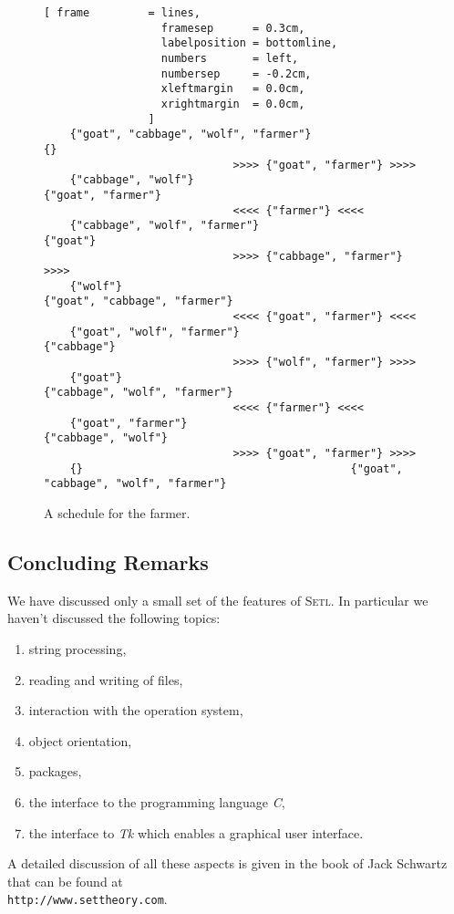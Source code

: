 \begin{figure}[!ht]
  \centering
\begin{Verbatim}[ frame         = lines, 
                  framesep      = 0.3cm, 
                  labelposition = bottomline,
                  numbers       = left,
                  numbersep     = -0.2cm,
                  xleftmargin   = 0.0cm,
                  xrightmargin  = 0.0cm,
                ]
    {"goat", "cabbage", "wolf", "farmer"}                                         {}
                             >>>> {"goat", "farmer"} >>>> 
    {"cabbage", "wolf"}                                           {"goat", "farmer"}
                             <<<< {"farmer"} <<<< 
    {"cabbage", "wolf", "farmer"}                                           {"goat"}
                             >>>> {"cabbage", "farmer"} >>>> 
    {"wolf"}                                           {"goat", "cabbage", "farmer"}
                             <<<< {"goat", "farmer"} <<<< 
    {"goat", "wolf", "farmer"}                                           {"cabbage"}
                             >>>> {"wolf", "farmer"} >>>> 
    {"goat"}                                           {"cabbage", "wolf", "farmer"}
                             <<<< {"farmer"} <<<< 
    {"goat", "farmer"}                                           {"cabbage", "wolf"}
                             >>>> {"goat", "farmer"} >>>> 
    {}                                         {"goat", "cabbage", "wolf", "farmer"}
\end{Verbatim} 
\vspace*{-0.3cm}
\caption{A schedule for the farmer.}  
\label{fig:wolf-ziege-solution}
\end{figure} %
\noindent
\pagebreak

\subsection{Concluding Remarks}
We have discussed only a small set of the features of  \textsc{Setl}.
In particular we haven't discussed the following topics:
\begin{enumerate}
\item string processing,
\item reading and writing of files,
\item interaction with the operation system,
\item object orientation,
\item packages,
\item the interface to the programming language  \textsl{C},
\item the interface to \textsl{Tk} which enables a graphical user interface.
\end{enumerate}
A detailed discussion of all these aspects is given in the book of  Jack
Schwartz \cite{schwarz03} that can be found at
 \\[0.2cm]
\hspace*{1.3cm} \texttt{http://www.settheory.com}. \\[0.2cm]

